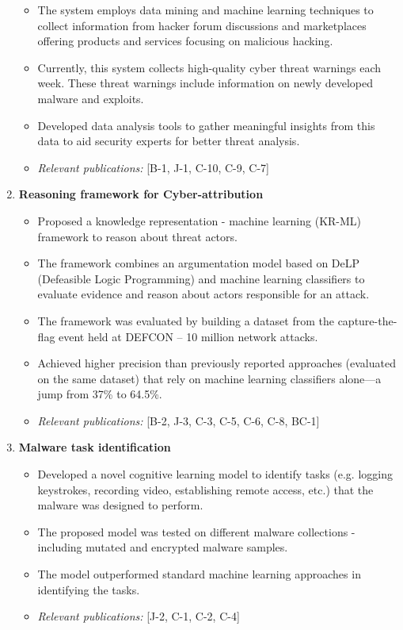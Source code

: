 \documentclass[margin,line]{CV}
\begin{document}
\begin{resume}
\begin{enumerate}
\begin{itemize}
		\item The system employs data mining and machine learning techniques to collect information from hacker forum discussions and marketplaces offering products and services focusing on malicious hacking. 
		
		\item Currently, this system collects high-quality cyber threat warnings each week. These threat warnings include information on newly developed malware and exploits. 
		
		\item Developed data analysis tools to gather meaningful insights from this data to aid security experts for better threat analysis. 
		
		\item {\em Relevant publications:} [B-1, J-1, C-10, C-9, C-7]
	\end{itemize}
	
	
	\item {\bf{Reasoning framework for Cyber-attribution}} 
	\begin{itemize}
		\item Proposed a knowledge representation - machine learning (KR-ML) framework to reason about threat actors. 
		
		\item The framework combines an argumentation model based on DeLP (Defeasible Logic Programming) and machine learning classifiers to evaluate evidence and reason about actors responsible for an attack.
		
		\item The framework was evaluated by building a dataset from the capture-the-flag event held at DEFCON -- 10 million network attacks. 
		
		\item Achieved higher precision than previously reported approaches (evaluated on the same dataset) that rely on machine learning classifiers alone---a jump from 37\% to 64.5\%.
		
		\item {\em Relevant publications:} [B-2, J-3, C-3, C-5, C-6, C-8, BC-1]
		
	\end{itemize}
	
	
	\item {\bf{Malware task identification}} 
	\begin{itemize}
		\item Developed a novel cognitive learning model to identify tasks (e.g. logging keystrokes, recording video, establishing remote access, etc.) that the malware was designed to perform. 
		\item The proposed model was tested on different malware collections - including mutated and encrypted malware samples. 
		\item The model outperformed standard machine learning approaches in identifying the tasks.
		\item {\em Relevant publications:} [J-2, C-1, C-2, C-4]
	\end{itemize}
	


\end{enumerate}
\end{resume}
\end{document}
